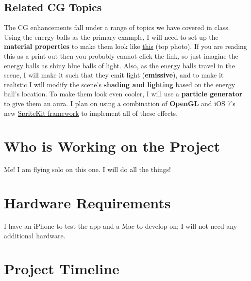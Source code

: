 \documentclass{article}
\begin{document}
\subsection{Related CG Topics}
The CG enhancements fall under a range of topics we have covered in class. Using the
energy balls as the primary example,
I will need to set up the \textbf{material properties} to make them look like 
\href{http://blog.tricyclestudios.com/?tag=hadouken-photo}{this} (top photo).
If you are reading this as a print out then you probably cannot click the 
link, so just imagine the energy balls as shiny blue balls of light.
Also, as the energy balls travel in the scene, I will make it such that 
they emit light (\textbf{emissive}), and to make it realistic I will modify
the scene's \textbf{shading and lighting} based on the energy ball's location.
To make them look even cooler, I will use a \textbf{particle generator} to give
them an aura. I plan on using a combination of \textbf{OpenGL} and iOS 7's new 
\href{https://developer.apple.com/library/ios/documentation/GraphicsAnimation/Conceptual/SpriteKit_PG/Introduction/Introduction.html#//apple_ref/doc/uid/TP40013043}{SpriteKit framework} to implement all of these effects.

\section{Who is Working on the Project}
Me! I am flying solo on this one. I will do all the things! 

\section{Hardware Requirements}
I have an iPhone to test the app and a Mac to develop on; I will not need 
any additional hardware.

\section{Project Timeline}
\end{document}
